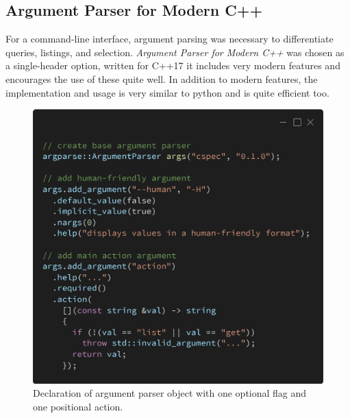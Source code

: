 \documentclass[conference]{IEEEtran}
\begin{document}
\subsection{Argument Parser for Modern C++}
For a command-line interface, argument parsing was necessary to differentiate queries, listings, and selection.
\textit{Argument Parser for Modern C++} was chosen as a single-header option, written for C++17 it includes very modern features and encourages the use of these quite well.
In addition to modern features, the implementation and usage is very similar to python and is quite efficient too.

\begin{figure}[!t]
    \centering
    \includegraphics[width=\linewidth]{fig-argparse}
    \caption{Declaration of argument parser object with one optional flag and one positional action.}
    \label{fig-argparse}
\end{figure}
\end{document}
